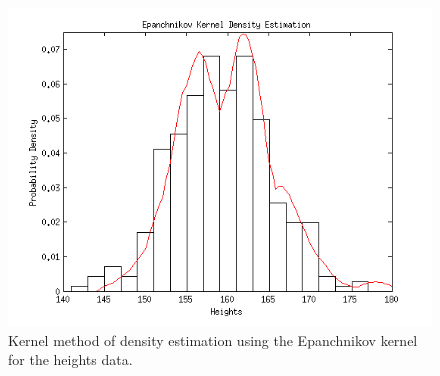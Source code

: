 \documentclass[12pt,a4paper]{article}
\begin{document}
\begin{figure}[ht!] 
\begin{center}
\includegraphics[scale=.86]{q9p22_graph2.png}
\caption{Kernel method of density estimation using the Epanchnikov kernel for the heights data.}
\label{q22 fig2}
\end{center}
\end{figure}
\FloatBarrier
\end{document}

